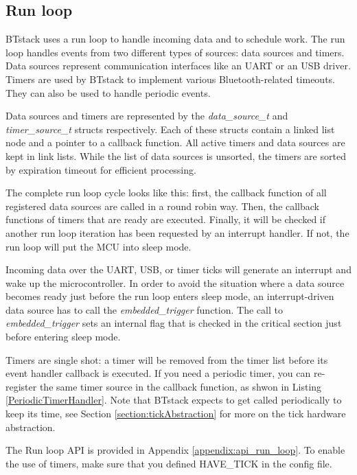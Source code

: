 \documentclass[a4paper,titlepage,oneside,12pt]{amsart} %
\begin{document}
\subsection{Run loop}
\label{section:run_loop}

BTstack uses a run loop to handle incoming data and to schedule work. The run loop handles events from two different types of sources: data sources and timers. Data sources represent communication interfaces like an UART or an USB driver. Timers are used by BTstack to implement various Bluetooth-related timeouts. They can also be used to handle periodic events. 

Data sources and timers are represented by the \emph{data\_source\_t} and \emph{timer\_source\_t} structs respectively. Each of these structs contain a linked list node and a pointer to a callback function. All active timers and data sources are kept in link lists. While the list of data sources is unsorted, the timers are sorted by expiration timeout for efficient processing.

The complete run loop cycle looks like this: first, the callback function of all registered data sources are called in a round robin way. Then, the callback functions of timers that are ready are executed. Finally, it will be checked if another run loop iteration has been requested by an interrupt handler. If not, the run loop will put the MCU into sleep mode.

Incoming data over the UART, USB, or timer ticks will generate an interrupt and wake up the microcontroller. In order to avoid the situation where a data source becomes ready just before the run loop enters sleep mode, an interrupt-driven data source has to call the \emph{embedded\_trigger} function. The call to \emph{embedded\_trigger} sets an internal flag that is checked in the critical section just before entering sleep mode. 

Timers are single shot: a timer will be removed from the timer list before its event handler callback is executed. If you need a periodic timer, you can re-register the same timer source in the callback function, as shwon in Listing \ref{PeriodicTimerHandler}. Note that BTstack expects to get called periodically to keep its time, see Section \ref{section:tickAbstraction} for more on the tick hardware abstraction. 

The Run loop API is provided in Appendix \ref{appendix:api_run_loop}. To enable the use of timers, make sure that you defined HAVE\_TICK in the config file.
\end{document}
